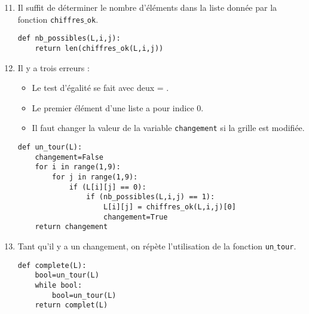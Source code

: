 \documentclass[a4paper,9pt]{report}
\begin{document}
\begin{enumerate}
\setcounter{enumi}{10}
\item Il suffit de déterminer le nombre d'éléments dans la liste donnée par la fonction {\tt chiffres$\_$ok}.

\begin{center}
\begin{minipage}{0.7\textwidth}
\begin{lstlisting}
def nb_possibles(L,i,j):
    return len(chiffres_ok(L,i,j))
\end{lstlisting}
\end{minipage}
\end{center}

\item Il y a trois erreurs :
\begin{itemize}
\item Le test d'égalité se fait avec deux \og = \fg.
\item Le premier élément d'une liste a pour indice $0$.
\item Il faut changer la valeur de la variable {\tt changement} si la grille est modifiée.
\end{itemize}

\begin{center}
\begin{minipage}{0.7\textwidth}
		
\begin{lstlisting}
def un_tour(L):
    changement=False
    for i in range(1,9):
        for j in range(1,9):
            if (L[i][j] == 0):
                if (nb_possibles(L,i,j) == 1):
                    L[i][j] = chiffres_ok(L,i,j)[0]
                    changement=True
    return changement
\end{lstlisting}
\end{minipage}
\end{center}
\item Tant qu'il y a un changement, on répète l'utilisation de la fonction {\tt un$\_$tour}.

\begin{center}
\begin{minipage}{0.7\textwidth}
		
\begin{lstlisting}
def complete(L):
    bool=un_tour(L)
    while bool:
        bool=un_tour(L)
    return complet(L)
\end{lstlisting}
\end{minipage}
\end{center}
\end{enumerate}
\end{document}
